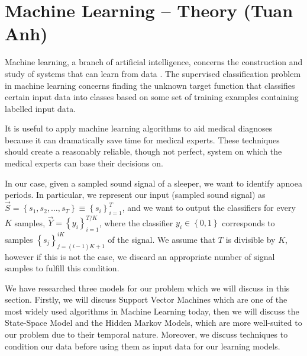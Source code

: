 \section{Machine Learning -- Theory (Tuan Anh)}
\label{sec:mltheory-ta}
	Machine learning, a branch of artificial intelligence, concerns the construction and study of systems that can learn from data \cite{wiki:machineLearning}. The supervised classification problem in machine learning concerns finding the unknown target function that classifies certain input data into classes based on some set of training examples containing labelled input data.

	It is useful to apply machine learning algorithms to aid medical diagnoses because it can dramatically save time for medical experts. These techniques should create a reasonably reliable, though not perfect, system on which the medical experts can base their decisions on.
	
	In our case, given a sampled sound signal of a sleeper, we want to identify apnoea periods. In particular, we represent our input (sampled sound signal) as $\vec S = \left\{s_1, s_2, \dotsc, s_T \right\} \equiv \left\{ s_i \right\}_{i = 1}^{T}$, and we want to output the classifiers for every $K$ samples, $\vec Y = \left\{ y_i \right\}_{i = 1}^{T/K}$, where the classifier $y_i \in \left\{0, 1\right\}$ corresponds to samples $\left\{ s_j \right\}_{j = \left(i - 1\right)K + 1}^{iK}$ of the signal. We assume that $T$ is divisible by $K$, however if this is not the case, we discard an appropriate number of signal samples to fulfill this condition.

	We have researched three models for our problem which we will discuss in this section. Firstly, we will discuss Support Vector Machines which are one of the most widely used algorithms in Machine Learning today, then we will discuss the State-Space Model and the Hidden Markov Models, which are more well-suited to our problem due to their temporal nature. Moreover, we discuss techniques to condition our data before using them as input data for our learning models.
	




